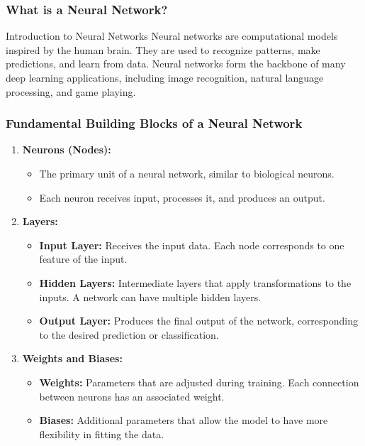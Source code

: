 \documentclass[aspectratio=169]{beamer}
\begin{document}
\begin{frame}[fragile]
    \frametitle{What is a Neural Network?}
    
    \begin{block}{Introduction to Neural Networks}
    Neural networks are computational models inspired by the human brain. They are used to recognize patterns, make predictions, and learn from data. Neural networks form the backbone of many deep learning applications, including image recognition, natural language processing, and game playing.
    \end{block}
\end{frame}

\begin{frame}[fragile]
    \frametitle{Fundamental Building Blocks of a Neural Network}
    
    \begin{enumerate}
        \item \textbf{Neurons (Nodes):}
            \begin{itemize}
                \item The primary unit of a neural network, similar to biological neurons.
                \item Each neuron receives input, processes it, and produces an output.
            \end{itemize}
        
        \item \textbf{Layers:}
            \begin{itemize}
                \item \textbf{Input Layer:} Receives the input data. Each node corresponds to one feature of the input.
                \item \textbf{Hidden Layers:} Intermediate layers that apply transformations to the inputs. A network can have multiple hidden layers.
                \item \textbf{Output Layer:} Produces the final output of the network, corresponding to the desired prediction or classification.
            \end{itemize}
        
        \item \textbf{Weights and Biases:}
            \begin{itemize}
                \item \textbf{Weights:} Parameters that are adjusted during training. Each connection between neurons has an associated weight.
                \item \textbf{Biases:} Additional parameters that allow the model to have more flexibility in fitting the data.
            \end{itemize}
        

\end{enumerate}
\end{frame}
\end{document}
